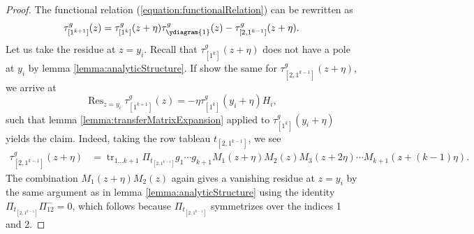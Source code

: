 \documentclass[11pt]{report}
\theoremstyle{definition}
\theoremstyle{remark}
\theoremstyle{remark}
\begin{document}
\begin{proof}
The functional relation (\ref{equation:functionalRelation}) can be rewritten as
\begin{equation*}
\tau_{[1^{k+1}]}^g(z) = \tau_{[1^k]}^g(z+\eta) \tau_{\ydiagram{1}}^g(z) - \tau_{[2,1^{k-1}]}^g(z+\eta).
\end{equation*}
Let us take the residue at $z=y_i$. Recall that $\tau_{[1^k]}^g(z+\eta)$ does not have a pole at $y_i$ by lemma \ref{lemma:analyticStructure}. If show the same for $\tau_{[2,1^{k-1}]}^g(z+\eta)$, we arrive at
\begin{equation*}
\operatorname{Res}_{z=y_i} \tau_{[1^{k+1}]}^g(z)
= -\eta \tau_{[1^k]}^g(y_i+\eta) H_i,
\end{equation*}
such that lemma \ref{lemma:transferMatrixExpansion} applied to $\tau_{[1^k]}^g(y_i+\eta)$ yields the claim.
Indeed, taking the row tableau $t_{[2,1^{k-1}]}$, we see
\begin{align*}
\tau_{[2,1^{k-1}]}^g(z+\eta)
&= \operatorname{tr}_{1...k+1} \Pi_{t_{[2,1^{k-1}]}} g_1 \cdots g_{k+1} M_1(z+\eta) M_2(z) M_3(z+2\eta) \cdots M_{k+1}(z+(k-1)\eta).
\end{align*}
The combination $M_1(z+\eta) M_2(z)$ again gives a vanishing residue at $z=y_i$ by the same argument as in lemma \ref{lemma:analyticStructure} using the identity $\Pi_{t_{[2,1^{k-1}]}} \Pi_{12}^- = 0$, which follows because $\Pi_{t_{[2,1^{k-1}]}}$ symmetrizes over the indices 1 and 2.
\end{proof}
\end{document}
